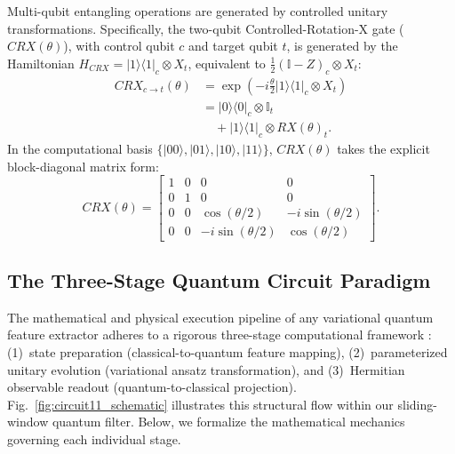 \documentclass[journal]{IEEEtran}
\begin{document}
Multi-qubit entangling operations are generated by controlled unitary transformations. Specifically, the two-qubit Controlled-Rotation-X gate ($CRX(\theta)$), with control qubit $c$ and target qubit $t$, is generated by the Hamiltonian $H_{CRX} = |1\rangle\langle 1|_c \otimes X_t$, equivalent to $\frac{1}{2}(\mathbb{I} - Z)_c \otimes X_t$:
\begin{align}
CRX_{c \to t}(\theta) &= \exp\left(-i \frac{\theta}{2} |1\rangle\langle 1|_c \otimes X_t \right) \nonumber \\
&= |0\rangle\langle 0|_c \otimes \mathbb{I}_t \nonumber \\
&\quad + |1\rangle\langle 1|_c \otimes RX(\theta)_t.
\label{eq:crx_matrix}
\end{align}
In the computational basis $\{|00\rangle, |01\rangle, |10\rangle, |11\rangle\}$, $CRX(\theta)$ takes the explicit block-diagonal matrix form:
\begin{equation}
CRX(\theta) = \begin{bmatrix} 
1 & 0 & 0 & 0 \\ 
0 & 1 & 0 & 0 \\ 
0 & 0 & \cos(\theta/2) & -i\sin(\theta/2) \\ 
0 & 0 & -i\sin(\theta/2) & \cos(\theta/2) 
\end{bmatrix}.
\label{eq:crx_explicit_matrix}
\end{equation}

\subsection{The Three-Stage Quantum Circuit Paradigm}
\label{subsec:three_stage_paradigm}
The mathematical and physical execution pipeline of any variational quantum feature extractor adheres to a rigorous three-stage computational framework \cite{schuld2021machine}: (1)~state preparation (classical-to-quantum feature mapping), (2)~parameterized unitary evolution (variational ansatz transformation), and (3)~Hermitian observable readout (quantum-to-classical projection). Fig.~\ref{fig:circuit11_schematic} illustrates this structural flow within our sliding-window quantum filter. Below, we formalize the mathematical mechanics governing each individual stage.
\end{document}
